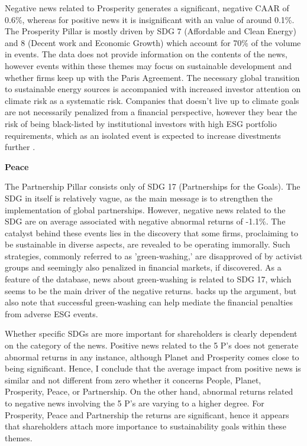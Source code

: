 Negative news related to Prosperity generates a significant, negative CAAR of 0.6\%, whereas for positive news it is insignificant with an value of around 0.1\%. The Prosperity Pillar is mostly driven by SDG 7 (Affordable and Clean Energy) and 8 (Decent work and Economic Growth) which account for 70\% of the volume in events. The data does not provide information on the contents of the news, however events within these themes may focus on sustainable development and whether firms keep up with the Paris Agreement. The necessary global transition to sustainable energy sources is accompanied with increased investor attention on climate risk as a systematic risk. Companies that doesn't live up to climate goals are not necessarily penalized from a financial perspective, however they bear the risk of being black-listed by institutional investors with high ESG portfolio requirements, which as an isolated event is expected to increase divestments further \cite{dell2021norwegian}. 


\textbf{Peace}


The Partnership Pillar consists only of SDG 17 (Partnerships for the Goals). The SDG in itself is relatively vague, as the main message is to strengthen the implementation of global partnerships. However, negative news related to the SDG are on average associated with negative abnormal returns of -1.1\%. The catalyst behind these events lies in the discovery that some firms, proclaiming to be sustainable in diverse aspects, are revealed to be operating immorally. Such strategies, commonly referred to as 'green-washing,' are disapproved of by activist groups and seemingly also penalized in financial markets, if discovered. As a feature of the database, news about green-washing is related to SDG 17, which seems to be the main driver of the negative returns. \cite{Blancard_ESG_sentiment} backs up the argument, but also note that successful green-washing can help mediate the financial penalties from adverse ESG events.  


Whether specific SDGs are more important for shareholders is clearly dependent on the category of the news. Positive news related to the 5 P's does not generate abnormal returns in any instance, although Planet and Prosperity comes close to being significant. Hence, I conclude that the average impact from positive news is similar and not different from zero whether it concerns People, Planet, Prosperity, Peace, or Partnership. On the other hand, abnormal returns related to negative news involving the 5 P's are varying to a higher degree. For Prosperity, Peace and Partnership the returns are significant, hence it appears that shareholders attach more importance to sustainability goals within these themes.   

